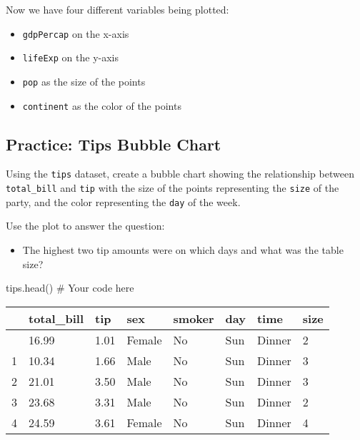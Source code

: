 \documentclass[
  letterpaper,
  DIV=11,
  numbers=noendperiod]{scrreprt}
\newenvironment{Shaded}{\begin{snugshade}}{\end{snugshade}}
\newcommand{\CommentTok}[1]{\textcolor[rgb]{0.37,0.37,0.37}{#1}}
\newcommand{\NormalTok}[1]{\textcolor[rgb]{0.00,0.23,0.31}{#1}}
\providecommand{\tightlist}{%
  \setlength{\itemsep}{0pt}\setlength{\parskip}{0pt}}\usepackage{longtable,booktabs,array}
\begin{document}
Now we have four different variables being plotted:

\begin{itemize}
\tightlist
\item
  \texttt{gdpPercap} on the x-axis
\item
  \texttt{lifeExp} on the y-axis
\item
  \texttt{pop} as the size of the points
\item
  \texttt{continent} as the color of the points
\end{itemize}

\begin{tcolorbox}[enhanced jigsaw, colframe=quarto-callout-tip-color-frame, opacityback=0, titlerule=0mm, bottomrule=.15mm, breakable, leftrule=.75mm, colbacktitle=quarto-callout-tip-color!10!white, title=\textcolor{quarto-callout-tip-color}{\faLightbulb}\hspace{0.5em}{Practice}, rightrule=.15mm, coltitle=black, opacitybacktitle=0.6, colback=white, left=2mm, arc=.35mm, toptitle=1mm, bottomtitle=1mm, toprule=.15mm]

\subsection{Practice: Tips Bubble
Chart}\label{practice-tips-bubble-chart}

Using the \texttt{tips} dataset, create a bubble chart showing the
relationship between \texttt{total\_bill} and \texttt{tip} with the size
of the points representing the \texttt{size} of the party, and the color
representing the \texttt{day} of the week.

Use the plot to answer the question:

\begin{itemize}
\tightlist
\item
  The highest two tip amounts were on which days and what was the table
  size?
\end{itemize}

\begin{Shaded}
\begin{Highlighting}[]
\NormalTok{tips.head()}
\CommentTok{\# Your code here}
\end{Highlighting}
\end{Shaded}

\begin{longtable}[]{@{}llllllll@{}}
\toprule\noalign{}
& total\_bill & tip & sex & smoker & day & time & size \\
\midrule\noalign{}
\endhead
\bottomrule\noalign{}
\endlastfoot
0 & 16.99 & 1.01 & Female & No & Sun & Dinner & 2 \\
1 & 10.34 & 1.66 & Male & No & Sun & Dinner & 3 \\
2 & 21.01 & 3.50 & Male & No & Sun & Dinner & 3 \\
3 & 23.68 & 3.31 & Male & No & Sun & Dinner & 2 \\
4 & 24.59 & 3.61 & Female & No & Sun & Dinner & 4 \\
\end{longtable}

\end{tcolorbox}
\end{document}
